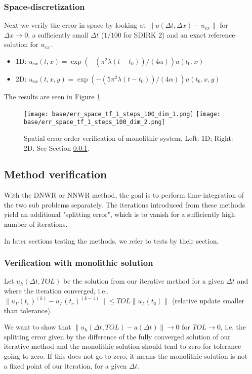\documentclass[a4paper,10pt]{article}
\begin{document}
\subsubsection{Space-discretization}\label{SEC SPACE ERROR}
% 
Next we verify the error in space by looking at $\| u(\Delta t, \Delta x) - u_{ex} \|$ for $\Delta x \rightarrow 0$, a sufficiently small $\Delta t$ ($1/100$ for SDIRK 2) and an exact reference solution for $u_{ex}$.
\begin{itemize}
\item 1D: $u_{ex}(t, x) = \exp(-(\pi^2 \lambda (t - t_0))/(4 \alpha)) u(t_0, x)$
\item 2D: $u_{ex}(t, x, y) = \exp(-(5 \pi^2 \lambda (t - t_0))/(4 \alpha)) u(t_0, x, y)$
\end{itemize}

The results are seen in Figure \ref{FIG SPACE ERR}.

\begin{figure}[!ht]
\begin{center}
\texttt{[image: base/err\_space\_tf\_1\_steps\_100\_dim\_1.png]}
\texttt{[image: base/err\_space\_tf\_1\_steps\_100\_dim\_2.png]}
\caption{Spatial error order verification of monolithic system. Left: 1D; Right: 2D. See Section \ref{SEC SPACE ERROR}.}
\label{FIG SPACE ERR}
\end{center}
\end{figure}
% 
\FloatBarrier
\subsection{Method verification}
% 
With the DNWR or NNWR method, the goal is to perform time-integration of the two sub problems separately. The iterations introduced from these methods yield an additional "splitting error", which is to vanish for a sufficiently high number of iterations.

In later sections testing the methods, we refer to tests by their section.
% 
\subsubsection{Verification with monolithic solution}\label{TEST MONO CONV}
% 
Let $u_h(\Delta t, TOL)$ be the solution from our iterative method for a given $\Delta t$ and where the iteration converged, i.e., $\| u_\Gamma(t_e)^{(k)} - u_\Gamma(t_e)^{(k-1)}\| \leq TOL \| u_\Gamma(t_0)\|$ (relative update smaller than tolerance).

We want to show that $\| u_h(\Delta t, TOL) - u(\Delta t)\| \rightarrow 0$ for $TOL \rightarrow 0$, i.e. the splitting error given by the difference of the fully converged solution of our iterative method and the monolithic solution should tend to zero for tolerance going to zero. If this does not go to zero, it means the monolithic solution is not a fixed point of our iteration, for a given $\Delta t$.
\end{document}
